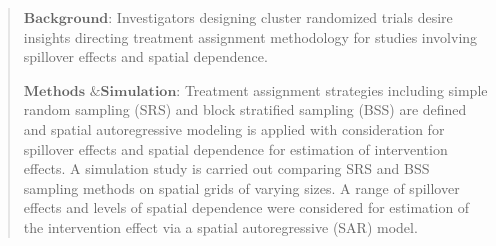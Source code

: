 \documentclass{article}[11pt]
\providecommand{\DIFdelbegin}{} %
\providecommand{\DIFdelend}{} %
\providecommand{\DIFscaledelfig}{0.5}
\newlength{\DIFdelgraphicswidth} %
\newlength{\DIFdelgraphicsheight} %
\providecommand{\DIFdelincludegraphics}[2][]{%
\sbox{\DIFdelgraphicsbox}{\DIFOincludegraphics[#1]{#2}}%
\settoboxwidth{\DIFdelgraphicswidth}{\DIFdelgraphicsbox} %
\settoboxtotalheight{\DIFdelgraphicsheight}{\DIFdelgraphicsbox} %
\scalebox{\DIFscaledelfig}{%
\parbox[b]{\DIFdelgraphicswidth}{\usebox{\DIFdelgraphicsbox}\\[-\baselineskip] \rule{\DIFdelgraphicswidth}{0em}}\llap{\resizebox{\DIFdelgraphicswidth}{\DIFdelgraphicsheight}{%
\setlength{\unitlength}{\DIFdelgraphicswidth}%
\begin{picture}(1,1)%
\thicklines\linethickness{2pt} %
{\color[rgb]{1,0,0}\put(0,0){\framebox(1,1){}}}%
{\color[rgb]{1,0,0}\put(0,0){\line( 1,1){1}}}%
{\color[rgb]{1,0,0}\put(0,1){\line(1,-1){1}}}%
\end{picture}%
}\hspace*{3pt}}} %
} %
\DeclareRobustCommand{\DIFdelbegin}{\DIFOdelbegin \let\includegraphics\DIFdelincludegraphics} %
\DeclareRobustCommand{\DIFdelend}{\DIFOaddend \let\includegraphics\DIFOincludegraphics} %
\begin{document}
\begin{abstract}
   $\textbf{Background}$: Investigators designing cluster randomized trials desire insights directing treatment assignment methodology for studies involving spillover effects and spatial dependence.

\DIFdelbegin %


\DIFdelend $\textbf{Methods \& Simulation}$: Treatment assignment strategies including simple random sampling (SRS) and block stratified sampling (BSS) are defined and spatial autoregressive modeling is applied with consideration for spillover effects and spatial dependence for estimation of intervention effects. A simulation study is carried out comparing SRS and BSS sampling methods on spatial grids of varying sizes. A range of spillover effects and levels of spatial dependence were considered for estimation of the intervention effect via a spatial autoregressive (SAR) model.

\DIFdelbegin %


\end{abstract}
\end{document}
